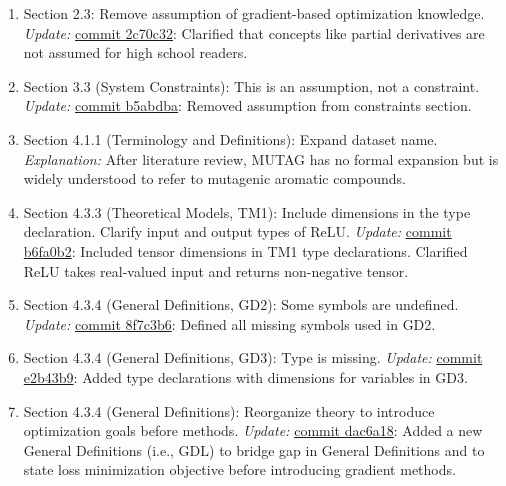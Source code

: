 \documentclass{article}
\begin{document}
\begin{enumerate}
    \item Section 2.3: Remove assumption of gradient-based optimization knowledge.  
    \newline \textit{Update:} \href{https://github.com/Yuanqi-X/Re-ProtGNN/commit/2c70c32}{commit 2c70c32}: Clarified that concepts like partial derivatives are not assumed for high school readers.

    \item Section 3.3 (System Constraints): This is an assumption, not a constraint.  
    \newline \textit{Update:} \href{https://github.com/Yuanqi-X/Re-ProtGNN/commit/b5abdba}{commit b5abdba}: Removed assumption from constraints section.

    \item Section 4.1.1 (Terminology and Definitions): Expand dataset name.  
    \newline \textit{Explanation:} After literature review, MUTAG has no formal expansion but is widely understood to refer to mutagenic aromatic compounds.

    \item Section 4.3.3 (Theoretical Models, TM1): Include dimensions in the type declaration. Clarify input and output types of ReLU.  
    \newline \textit{Update:} \href{https://github.com/Yuanqi-X/Re-ProtGNN/commit/b6fa0b2}{commit b6fa0b2}: Included tensor dimensions in TM1 type declarations. Clarified ReLU takes real-valued input and returns non-negative tensor.

    \item Section 4.3.4 (General Definitions, GD2): Some symbols are undefined.  
    \newline \textit{Update:} \href{https://github.com/Yuanqi-X/Re-ProtGNN/commit/8f7c3b6}{commit 8f7c3b6}: Defined all missing symbols used in GD2.

    \item Section 4.3.4 (General Definitions, GD3): Type is missing.  
    \newline \textit{Update:} \href{https://github.com/Yuanqi-X/Re-ProtGNN/commit/e2b43b9}{commit e2b43b9}: Added type declarations with dimensions for variables in GD3.

    \item Section 4.3.4 (General Definitions): Reorganize theory to introduce optimization goals before methods.  
    \newline \textit{Update:} \href{https://github.com/Yuanqi-X/Re-ProtGNN/commit/dac6a18}{commit dac6a18}: Added a new General Definitions (i.e., GDL) to bridge gap in General Definitions and to state loss minimization objective before introducing gradient methods.


\end{enumerate}
\end{document}
